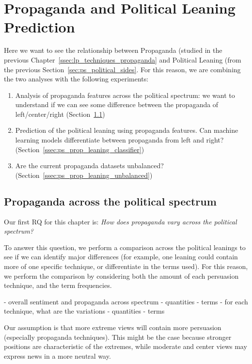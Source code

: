 \section{\statusorange Propaganda and Political Leaning Prediction}
\label{sec:ps_prop_and_leaning}

Here we want to see the relationship between Propaganda (studied in the previous Chapter~\ref{ssec:lp_techniques_propaganda} and Political Leaning (from the previous Section~\ref{sec:ps_political_sides}.
For this reason, we are combining the two analyses with the following experiments:

\begin{enumerate}
    \item Analysis of propaganda features across the political spectrum: we want to understand if we can see some difference between the propaganda of left/center/right (Section~\ref{ssec:ps_prop_leaning_across})
    \item Prediction of the political leaning using propaganda features. Can machine learning models differentiate between propaganda from left and right? (Section~\ref{ssec:ps_prop_leaning_classifier})
    \item Are the current propaganda datasets unbalanced? (Section~\ref{ssec:ps_prop_leaning_unbalanced})
\end{enumerate}

\subsection{\statusorange Propaganda across the political spectrum}
\label{ssec:ps_prop_leaning_across}

Our first RQ for this chapter is: \emph{How does propaganda vary across the political spectrum?}

To answer this question, we perform a comparison across the political leanings to see if we can identify major differences (for example, one leaning could contain more of one specific technique, or differentiate in the terms used).
For this reason, we perform the comparison by considering both the amount of each persuasion technique, and the term frequencies.

- overall sentiment and propaganda across spectrum
    - quantities
    - terms
- for each technique, what are the variations
    - quantities
    - terms


Our assumption is that more extreme views will contain more persuasion (especially propaganda techniques). This might be the case because stronger positions are characteristic of the extremes, while moderate and center views may express news in a more neutral way.

